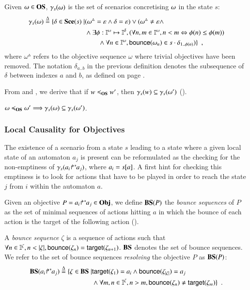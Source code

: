 
\begin{definition}[$\concr: \OS \to \powerset(\Sce)$]\label{def:concr}
Given $\omega\in\mathbf{OS}$, $\gamma_s(\omega)$ is the set of scenarios concretising $\omega$ in the
state $s$:
\begin{align*}
\gamma_s(\omega) \stackrel{\Delta}= \{ \delta\in\mathbf{Sce}(s)\mid & (\omega^\vartriangle=\varepsilon \wedge
\delta=\varepsilon)  \vee (
\omega^\vartriangle\neq \varepsilon\wedge
\\ &
 \wedge \exists \phi:\mathbb{I}^{\omega}\mapsto\mathbb{I}^{\delta},
    (\forall n,m\in\mathbb{I}^{\omega}, n<m \Leftrightarrow \phi(n)\leq\phi(m))
\\ & \qquad
	\wedge \forall n\in\mathbb{I}^{\omega},
	  \mathsf{bounce}(\omega_n) \in s\cdot\delta_{1..\phi(n)})
\}
\enspace,
\end{align*}
where $\omega^\vartriangle$ refers to the objective sequence $\omega$ where
trivial objectives have been removed.
The notation $\delta_{a..b}$ in the previous definition
denotes the subsequence of $\delta$ between indexes $a$ and $b$,
as defined on page \pageref{notations}.
\end{definition}

From  and , we derive that if 
$w\preccurlyeq_{\mathbf{OS}} w'$, then $\gamma_s(w)\subseteq\gamma_s(\omega')$ ().
\begin{lemma}\label{lem:ltw}
$\omega\preccurlyeq_{\mathbf{OS}}\omega' \Longrightarrow \gamma_s(\omega)\subseteq\gamma_s(\omega')$\enspace.
\end{lemma}


\subsubsection{Local Causality for Objectives}

The existence of a scenario from a state $s$ leading to a state
where a given local state of an automaton $a_j$ is present
can be reformulated as the checking for the non-emptiness of $\gamma_s({a_i\!\Rsh^*\!\!a_j})$, where
$a_i=s[{a}]$.
A first hint for checking this emptiness is to look for actions that have to be played in order to
reach the state $j$ from $i$ within the automaton $a$.

Given an objective $P = {a_i\!\Rsh^*\!\!a_j} \in\mathbf{Obj}$, we define $\mathbf{BS}(P)$ the \emph{bounce sequences} of
$P$ as the set of minimal sequences of actions hitting $a$ in which the bounce of each action is
the target of the following action ().

\begin{definition}\label{def:bs}
A \emph{bounce sequence} $\zeta$  is a sequence of actions such that
$\forall n\in\indexes{\zeta}, n<|\zeta|,
\bounce{\zeta_{n}} = \target{\zeta_{n+1}}$.
$\mathbf{BS}$ denotes the set of bounce sequences.
We refer to the set of bounce sequences \emph{resolving} the objective $P$ as
$\mathbf{BS}(P)$:
\begin{align*}
\mathbf{BS}({a_i\!\Rsh^*\!\!a_j}) \stackrel{\Delta}= \{ \zeta\in\mathbf{BS}\mid & \mathsf{target}(\zeta_1)=a_i\wedge
			    \mathsf{bounce}(\zeta_{|\zeta|})=a_j \\
& \wedge \forall m,n\in\mathbb{I}^{\zeta}, n>m, \mathsf{bounce}(\zeta_n)\neq\mathsf{target}(\zeta_m)
				\}\enspace.
\end{align*}
\end{definition}

